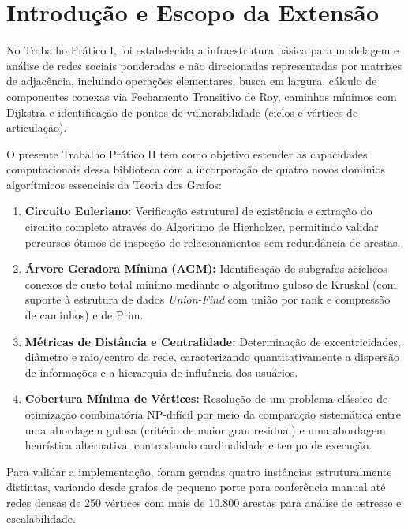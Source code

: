 \documentclass[12pt,a4paper]{article}
\begin{document}
\section{Introdução e Escopo da Extensão}

No Trabalho Prático I, foi estabelecida a infraestrutura básica para modelagem e análise de redes sociais ponderadas e não direcionadas representadas por matrizes de adjacência, incluindo operações elementares, busca em largura, cálculo de componentes conexas via Fechamento Transitivo de Roy, caminhos mínimos com Dijkstra e identificação de pontos de vulnerabilidade (ciclos e vértices de articulação).

O presente Trabalho Prático II tem como objetivo estender as capacidades computacionais dessa biblioteca com a incorporação de quatro novos domínios algorítmicos essenciais da Teoria dos Grafos:
\begin{enumerate}
    \item \textbf{Circuito Euleriano:} Verificação estrutural de existência e extração do circuito completo através do Algoritmo de Hierholzer, permitindo validar percursos ótimos de inspeção de relacionamentos sem redundância de arestas.
    \item \textbf{Árvore Geradora Mínima (AGM):} Identificação de subgrafos acíclicos conexos de custo total mínimo mediante o algoritmo guloso de Kruskal (com suporte à estrutura de dados \textit{Union-Find} com união por rank e compressão de caminhos) e de Prim.
    \item \textbf{Métricas de Distância e Centralidade:} Determinação de excentricidades, diâmetro e raio/centro da rede, caracterizando quantitativamente a dispersão de informações e a hierarquia de influência dos usuários.
    \item \textbf{Cobertura Mínima de Vértices:} Resolução de um problema clássico de otimização combinatória NP-difícil por meio da comparação sistemática entre uma abordagem gulosa (critério de maior grau residual) e uma abordagem heurística alternativa, contrastando cardinalidade e tempo de execução.
\end{enumerate}

Para validar a implementação, foram geradas quatro instâncias estruturalmente distintas, variando desde grafos de pequeno porte para conferência manual até redes densas de 250 vértices com mais de 10.800 arestas para análise de estresse e escalabilidade.

\end{document}
